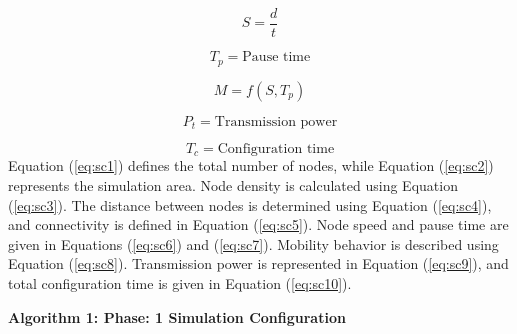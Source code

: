 \documentclass[a4paper,fleqn]{cas-dc}
\numberwithin{equation}{section}
\begin{document}
\begin{equation}
S = \frac{d}{t}
\label{eq:sc6}
\end{equation}

\begin{equation}
T_p = \text{Pause time}
\label{eq:sc7}
\end{equation}

\begin{equation}
M = f(S, T_p)
\label{eq:sc8}
\end{equation}

\begin{equation}
P_t = \text{Transmission power}
\label{eq:sc9}
\end{equation}

\begin{equation}
T_c = \text{Configuration time}
\label{eq:sc10}
\end{equation}
Equation (\ref{eq:sc1}) defines the total number of nodes, while Equation (\ref{eq:sc2}) represents the simulation area. Node density is calculated using Equation (\ref{eq:sc3}). The distance between nodes is determined using Equation (\ref{eq:sc4}), and connectivity is defined in Equation (\ref{eq:sc5}). Node speed and pause time are given in Equations (\ref{eq:sc6}) and (\ref{eq:sc7}). Mobility behavior is described using Equation (\ref{eq:sc8}). Transmission power is represented in Equation (\ref{eq:sc9}), and total configuration time is given in Equation (\ref{eq:sc10}).

\noindent\textbf{Algorithm 1: Phase: 1 Simulation Configuration }
\label{alg:phase1}
\end{document}
